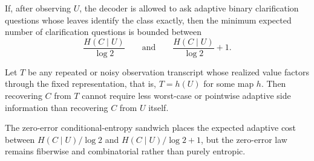 \begin{corollary}
If, after observing $U$, the decoder is allowed to ask adaptive binary clarification questions whose leaves identify the class exactly, then the minimum expected number of clarification questions is bounded between
\[
\frac{H(C\mid U)}{\log 2}
\qquad\text{and}\qquad
\frac{H(C\mid U)}{\log 2}+1.
\]
\end{corollary}


\begin{corollary}
Let $T$ be any repeated or noisy observation transcript whose realized value factors through the fixed representation, that is, $T = h(U)$ for some map $h$. Then recovering $C$ from $T$ cannot require less worst-case or pointwise adaptive side information than recovering $C$ from $U$ itself.
\end{corollary}

The zero-error conditional-entropy sandwich places the expected adaptive cost between $H(C\mid U)/\log 2$ and $H(C\mid U)/\log 2 + 1$, but the zero-error law remains fiberwise and combinatorial rather than purely entropic.
